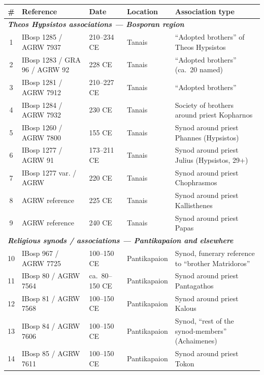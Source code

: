 \documentclass[11pt,oneside]{article}
\begin{document}
\begin{center}
\footnotesize
\setlength{\tabcolsep}{3pt}
\renewcommand{\arraystretch}{1.15}
\begin{tabular}{@{}clllp{3.3cm}@{}}
\toprule
\# & Reference & Date & Location & Association type \\
\midrule
\multicolumn{5}{l}{\textit{\textbf{Theos Hypsistos associations — Bosporan region}}} \\
 1 & IBosp 1285 / AGRW 7937        & 210--234 CE & Tanais       & ``Adopted brothers'' of Theos Hypsistos \\
 2 & IBosp 1283 / GRA 96 / AGRW 92 & 228 CE      & Tanais       & ``Adopted brothers'' (ca.~20 named) \\
 3 & IBosp 1281 / AGRW 7912        & 210--227 CE & Tanais       & ``Adopted brothers'' \\
 4 & IBosp 1284 / AGRW 7932        & 230 CE      & Tanais       & Society of brothers around priest Kopharnos \\
 5 & IBosp 1260 / AGRW 7800        & 155 CE      & Tanais       & Synod around priest Phannes (Hypsistos) \\
 6 & IBosp 1277 / AGRW 91          & 173--211 CE & Tanais       & Synod around priest Julius (Hypsistos, 29+) \\
 7 & IBosp 1277 var. / AGRW        & 220 CE      & Tanais       & Synod around priest Chophrasmos \\
 8 & AGRW reference                & 225 CE      & Tanais       & Synod around priest Kallisthenes \\
 9 & AGRW reference                & 240 CE      & Tanais       & Synod around priest Papas \\
\multicolumn{5}{l}{\textit{\textbf{Religious synods / associations — Pantikapaion and elsewhere}}} \\
10 & IBosp 967 / AGRW 7725         & 100--150 CE & Pantikapaion & Synod, funerary reference to ``brother Matridoros'' \\
11 & IBosp 80 / AGRW 7564          & ca.~80--150 CE & Pantikapaion & Synod around priest Pantagathos \\
12 & IBosp 81 / AGRW 7568          & 100--150 CE & Pantikapaion & Synod around priest Kalous \\
13 & IBosp 84 / AGRW 7606          & 100--150 CE & Pantikapaion & Synod, ``rest of the synod-members'' (Achaimenes) \\
14 & IBosp 85 / AGRW 7611          & 100--150 CE & Pantikapaion & Synod around priest Tokon \\

\end{tabular}
\end{center}
\end{document}
